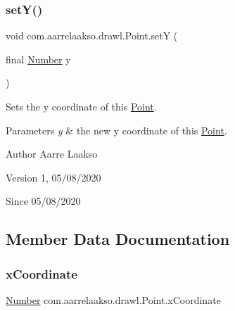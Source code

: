\subsubsection{\texorpdfstring{set\+Y()}{setY()}}
{\footnotesize\ttfamily void com.\+aarrelaakso.\+drawl.\+Point.\+setY (\begin{DoxyParamCaption}\item[{final \hyperlink{interfacecom_1_1aarrelaakso_1_1drawl_1_1_number}{Number}}]{y }\end{DoxyParamCaption})\hspace{0.3cm}{\ttfamily [package]}}



Sets the y coordinate of this \hyperlink{classcom_1_1aarrelaakso_1_1drawl_1_1_point}{Point}. 


\begin{DoxyParams}{Parameters}
{\em y} & the new y coordinate of this \hyperlink{classcom_1_1aarrelaakso_1_1drawl_1_1_point}{Point}. \\
\hline
\end{DoxyParams}
\begin{DoxyAuthor}{Author}
Aarre Laakso 
\end{DoxyAuthor}
\begin{DoxyVersion}{Version}
1, 05/08/2020 
\end{DoxyVersion}
\begin{DoxySince}{Since}
05/08/2020 
\end{DoxySince}


\subsection{Member Data Documentation}
\mbox{\label{classcom_1_1aarrelaakso_1_1drawl_1_1_point_aa5144c5cca82c86f845bead6d4a51041}} 
\subsubsection{\texorpdfstring{x\+Coordinate}{xCoordinate}}
{\footnotesize\ttfamily \hyperlink{interfacecom_1_1aarrelaakso_1_1drawl_1_1_number}{Number} com.\+aarrelaakso.\+drawl.\+Point.\+x\+Coordinate\hspace{0.3cm}{\ttfamily [private]}}

